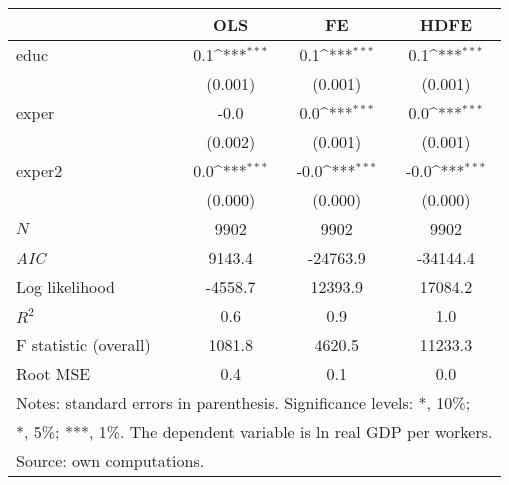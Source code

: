 {
\def\sym#1{\ifmmode^{#1}\else\(^{#1}\)\fi}
\begin{tabular}{l*{3}{c}}
\hline\hline
            &\multicolumn{1}{c}{OLS}&\multicolumn{1}{c}{FE}&\multicolumn{1}{c}{HDFE}\\
\hline
educ        &         0.1\sym{***}&         0.1\sym{***}&         0.1\sym{***}\\
            &     (0.001)         &     (0.001)         &     (0.001)         \\
[1em]
exper       &        -0.0         &         0.0\sym{***}&         0.0\sym{***}\\
            &     (0.002)         &     (0.001)         &     (0.001)         \\
[1em]
exper2      &         0.0\sym{***}&        -0.0\sym{***}&        -0.0\sym{***}\\
            &     (0.000)         &     (0.000)         &     (0.000)         \\
\hline
\(N\)       &        9902         &        9902         &        9902         \\
\textit{AIC}&      9143.4         &    -24763.9         &    -34144.4         \\
Log likelihood&     -4558.7         &     12393.9         &     17084.2         \\
$R^{2}$     &         0.6         &         0.9         &         1.0         \\
F statistic (overall)&      1081.8         &      4620.5         &     11233.3         \\
Root MSE    &         0.4         &         0.1         &         0.0         \\
\hline\hline
\multicolumn{4}{l}{\footnotesize Notes: standard errors in parenthesis. Significance levels: *, 10\%;}\\
\multicolumn{4}{l}{\footnotesize **, 5\%; ***, 1\%. The dependent variable is ln real GDP per workers.}\\
\multicolumn{4}{l}{\footnotesize Source: own computations.}\\
\end{tabular}
}
